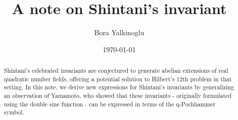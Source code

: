 \documentclass[11pt, a4paper]{amsart}
\theoremstyle{plain}
\numberwithin{equation}{section}
\begin{document}
\author{Bora Yalkinoglu} 
\address{CNRS and IRMA, Strasbourg}
\date{\today}
\title{A note on Shintani's invariant}

\maketitle


\begin{abstract}
\noindent
Shintani's celebrated invariants are conjectured to generate abelian extensions of real quadratic number fields, offering a potential solution to Hilbert's 12th problem in that setting. In this note, we derive new expressions for Shintani's invariants by generalizing an observation of Yamamoto, who showed that these invariants - originally formulated using the double sine function - can be expressed in terms of the q-Pochhammer symbol.   
\end{abstract}
\end{document}
